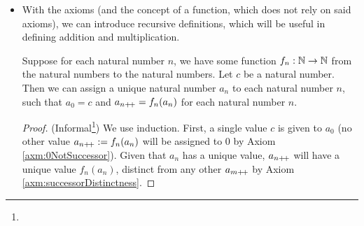 \documentclass[../main.tex]{subfiles}
\begin{document}
\begin{itemize}
\begin{itemize}
        \item {}
    \end{itemize}
    \item With the axioms (and the concept of a function, which does not rely on said axioms), we can introduce recursive definitions, which will be useful in defining addition and multiplication.
    \begin{prp}\label{prp:recursiveDefinitions}
        Suppose for each natural number $n$, we have some function $f_n:\mathbb{N}\to\mathbb{N}$ from the natural numbers to the natural numbers. Let $c$ be a natural number. Then we can assign a unique natural number $a_n$ to each natural number $n$, such that $a_0=c$ and $a_{n{+\!+}}=f_n(a_n)$ for each natural number $n$.
        \begin{proof}
            (Informal\footnote{}) We use induction. First, a single value $c$ is given to $a_0$ (no other value $a_{n{+\!+}}:=f_n(a_n)$ will be assigned to 0 by Axiom \ref{axm:0NotSuccessor}). Given that $a_n$ has a unique value, $a_{n{+\!+}}$ will have a unique value $f_n(a_n)$, distinct from any other $a_{m{+\!+}}$ by Axiom \ref{axm:successorDistinctness}.
        \end{proof}
    \end{prp}
\end{itemize}
\end{document}
